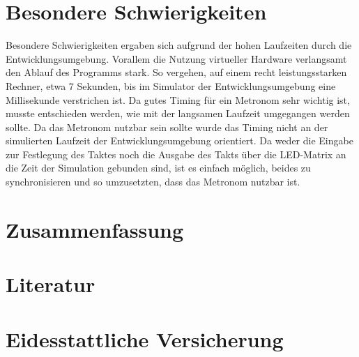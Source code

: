 \documentclass[a4paper, 10pt]{scrartcl}
\begin{document}
\section{Besondere Schwierigkeiten}
Besondere Schwierigkeiten ergaben sich aufgrund der hohen Laufzeiten durch die Entwicklungsumgebung. Vorallem die Nutzung virtueller Hardware verlangsamt den Ablauf des Programms stark. So vergehen, auf einem recht leistungsstarken Rechner, etwa 7 Sekunden, bis im Simulator der Entwicklungsumgebung eine Millisekunde verstrichen ist. Da gutes Timing für ein Metronom sehr wichtig ist, musste entschieden werden, wie mit der langsamen Laufzeit umgegangen werden sollte. Da das Metronom nutzbar sein sollte wurde das Timing nicht an der simulierten Laufzeit der Entwicklungsumgebung orientiert. Da weder die Eingabe zur Festlegung des Taktes noch die Ausgabe des Takts über die LED-Matrix an die Zeit der Simulation gebunden sind, ist es einfach möglich, beides zu synchronisieren und so umzusetzten, dass das Metronom nutzbar ist.
\\

\section{Zusammenfassung}

\section{Literatur}
\section{Eidesstattliche Versicherung}
\end{document}
